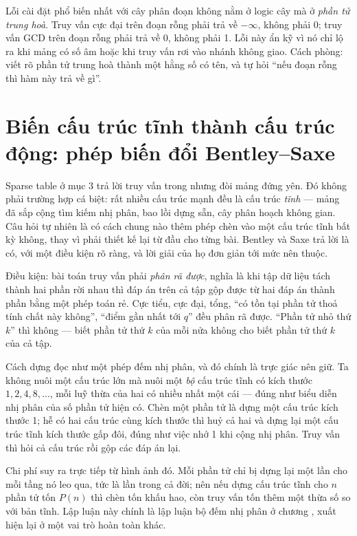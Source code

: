 \documentclass[../../algorithm.tex]{subfiles}
\begin{document}
\begin{cambay}
Lỗi cài đặt phổ biến nhất với cây phân đoạn không nằm ở logic cây mà ở \emph{phần tử trung hoà}. Truy vấn cực đại trên đoạn rỗng phải trả về \(-\infty\), không phải 0; truy vấn GCD trên đoạn rỗng phải trả về 0, không phải 1. Lỗi này ẩn kỹ vì nó chỉ lộ ra khi mảng có số âm hoặc khi truy vấn rơi vào nhánh không giao. Cách phòng: viết rõ phần tử trung hoà thành một hằng số có tên, và tự hỏi ``nếu đoạn rỗng thì hàm này trả về gì''.
\end{cambay}


\section{Biến cấu trúc tĩnh thành cấu trúc động: phép biến đổi Bentley--Saxe}

Sparse table ở mục 3 trả lời truy vấn trong  nhưng đòi mảng đứng yên. Đó không phải trường hợp cá biệt: rất nhiều cấu trúc mạnh đều là cấu trúc \emph{tĩnh} --- mảng đã sắp cộng tìm kiếm nhị phân, bao lồi dựng sẵn, cây phân hoạch không gian. Câu hỏi tự nhiên là có cách chung nào thêm phép chèn vào một cấu trúc tĩnh bất kỳ không, thay vì phải thiết kế lại từ đầu cho từng bài. Bentley và Saxe\cite{bentley1980} trả lời là có, với một điều kiện rõ ràng, và lời giải của họ đơn giản tới mức nên thuộc.

Điều kiện: bài toán truy vấn phải \emph{phân rã được}, nghĩa là khi tập dữ liệu tách thành hai phần rời nhau thì đáp án trên cả tập gộp được từ hai đáp án thành phần bằng một phép toán rẻ. Cực tiểu, cực đại, tổng, ``có tồn tại phần tử thoả tính chất này không'', ``điểm gần nhất tới \(q\)'' đều phân rã được. ``Phần tử nhỏ thứ \(k\)'' thì không --- biết phần tử thứ \(k\) của mỗi nửa không cho biết phần tử thứ \(k\) của cả tập.

Cách dựng đọc như một phép đếm nhị phân, và đó chính là trực giác nên giữ. Ta không nuôi một cấu trúc lớn mà nuôi một \emph{bộ} cấu trúc tĩnh có kích thước \(1, 2, 4, 8,\dots\), mỗi luỹ thừa của hai có nhiều nhất một cái --- đúng như biểu diễn nhị phân của số phần tử hiện có. Chèn một phần tử là dựng một cấu trúc kích thước 1; hễ có hai cấu trúc cùng kích thước thì huỷ cả hai và dựng lại một cấu trúc tĩnh kích thước gấp đôi, đúng như việc nhớ 1 khi cộng nhị phân. Truy vấn thì hỏi cả  cấu trúc rồi gộp các đáp án lại.

Chi phí suy ra trực tiếp từ hình ảnh đó. Mỗi phần tử chỉ bị dựng lại một lần cho mỗi tầng nó leo qua, tức là  lần trong cả đời; nên nếu dựng cấu trúc tĩnh cho \(n\) phần tử tốn \(P(n)\) thì chèn tốn  khấu hao, còn truy vấn tốn thêm một thừa số  so với bản tĩnh. Lập luận này chính là lập luận bộ đếm nhị phân ở chương , xuất hiện lại ở một vai trò hoàn toàn khác.
\end{document}

